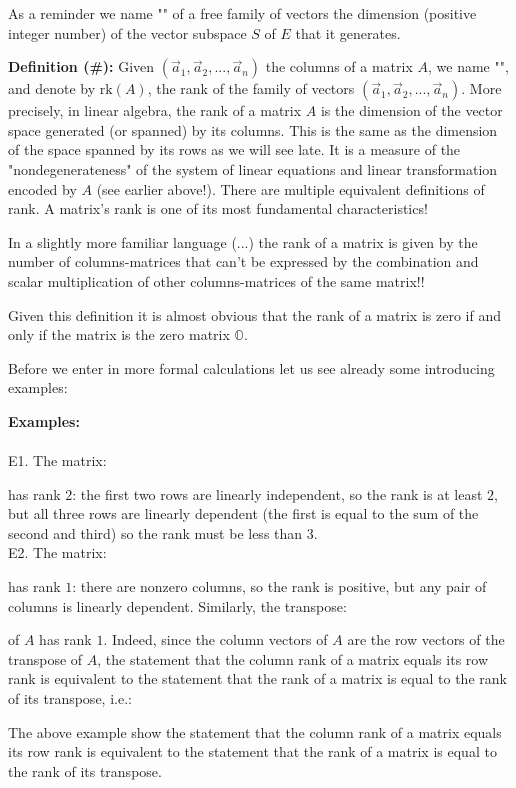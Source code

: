 	As a reminder we name "" of a free family of vectors the dimension (positive integer number) of the vector subspace $S$ of $E$ that it generates.
	
	\textbf{Definition (\#\mydef):} Given $(\vec{a}_1,\vec{a}_2,...,\vec{a}_n)$ the columns of a matrix $A$, we name "", and denote by $\text{rk}(A)$, the rank of the family of vectors $(\vec{a}_1,\vec{a}_2,...,\vec{a}_n)$. More precisely, in linear algebra, the rank of a matrix $A$ is the dimension of the vector space generated (or spanned) by its columns. This is the same as the dimension of the space spanned by its rows as we will see late. It is a measure of the "nondegenerateness" of the system of linear equations and linear transformation encoded by $A$ (see earlier above!). There are multiple equivalent definitions of rank. A matrix's rank is one of its most fundamental characteristics!
	
	In a slightly more familiar language (...) the rank of a matrix is given by the number of columns-matrices that can't be expressed by the combination and scalar multiplication of other columns-matrices of the same matrix!!
	
	Given this definition it is almost obvious that the rank of a matrix is zero if and only if the matrix is the zero matrix $\mathds{O}$.
	
	Before we enter in more formal calculations let us see already some introducing examples:
	\begin{tcolorbox}[colframe=black,colback=white,sharp corners]
	\textbf{{\Large {}}Examples:}\\\\
	E1. The matrix:
	
	has rank $2$: the first two rows are linearly independent, so the rank is at least $2$, but all three rows are linearly dependent (the first is equal to the sum of the second and third) so the rank must be less than $3$.\\
	
	E2. The matrix:
	
	has rank $1$: there are nonzero columns, so the rank is positive, but any pair of columns is linearly dependent. Similarly, the transpose:
	
	of $A$ has rank $1$. Indeed, since the column vectors of $A$ are the row vectors of the transpose of $A$, the statement that the column rank of a matrix equals its row rank is equivalent to the statement that the rank of a matrix is equal to the rank of its transpose, i.e.:
	
	\end{tcolorbox}
	The above example show the statement that the column rank of a matrix equals its row rank is equivalent to the statement that the rank of a matrix is equal to the rank of its transpose.
	
